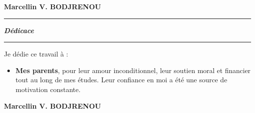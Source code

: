 \documentclass[a4paper,12pt]{report}
\theoremstyle{definition}
\begin{document}
	\vspace{0.5cm}
	\phantom{fjjffcmffffffffffffffffffffffjfffffffffffffffffffffffffjfjfjffjjjjjjjjjjjjjjhhhh} \textbf{Marcellin V. BODJRENOU}
	\newpage
	
	
	\begin{center}
		\colorbox{gray!0}{\rule{\textwidth}{0.005cm}}
		{\Huge\textbf{\textit{Dédicace}}}
		\vspace{1cm}
		\colorbox{gray!0}{\rule{\textwidth}{0.005cm}}
	\end{center}
	Je dédie ce travail à :
	\begin{itemize}[label=$\bigstar$]
		\item \textbf{Mes parents}, pour leur amour inconditionnel, leur soutien moral et financier tout au long de mes études. Leur confiance en moi a été une source de motivation constante. 
	\end{itemize}
	\vspace{0.7cm}
	\phantom{fjjffcmffffffffffffffffffffffjfffffffffffffffffffffffffjfjfjffjjjjjjjjjjjjjjhhhhhm} \textbf{Marcellin V. BODJRENOU}
	\newpage
	
\end{document}
